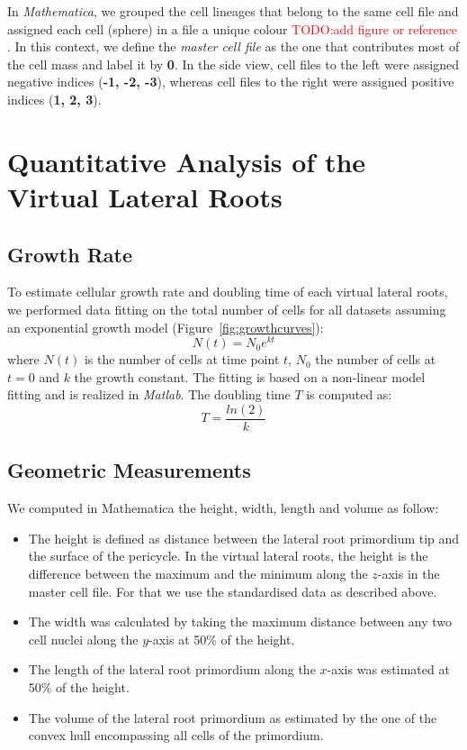 \documentclass[11pt,a4paper, final]{article}
\newcommand{\TODO}[1]{
\textcolor{red}{TODO:#1}
}
\newenvironment{Itemize}{
  \begin{itemize}[leftmargin=0.5cm]{
}}{\end{itemize}}
\begin{document}
In \textit{Mathematica}, we grouped the cell lineages that belong to the same cell file and assigned each cell (sphere) in a file a unique colour \TODO{add figure or reference}. In this context, we define the \textit{master cell file} as the one that contributes most of the cell mass and label it by \textbf{0}. In the side view, cell files to the left were assigned negative indices (\textbf{-1, -2, -3}), whereas cell files to the right were assigned positive indices (\textbf{1, 2, 3}).

\clearpage
\section{Quantitative Analysis of the Virtual Lateral Roots}
\subsection{Growth Rate}
To estimate cellular growth rate and doubling time of each virtual lateral roots, we performed data fitting on the total number of cells for all datasets assuming an exponential growth model (Figure~\ref{fig:growthcurves}):
\begin{equation}
N(t)=N_0e^{kt}
\end{equation} 
where $N(t)$ is the number of cells at time point $t$, $N_0$ the number of cells at $t=0$ and $k$ the growth constant. The fitting is based on a non-linear model fitting and is realized in \textit{Matlab}.
The doubling time $T$ is computed as:
\begin{equation}
T=\frac{ln(2)}{k}
\end{equation}

\subsection{Geometric Measurements}
We computed in Mathematica the height, width, length and volume as follow:
\begin{Itemize}
 \item The height is defined as distance between the lateral root primordium tip and the surface of the pericycle. In the virtual lateral roots, the height is the difference between the maximum and the minimum along the $z$-axis in the master cell file. For that we use the standardised data as described above.
 \item The width was calculated by taking the maximum distance between any two cell nuclei along the $y$-axis at 50\% of the height.
 \item The length of the lateral root primordium along the $x$-axis was estimated at 50\% of the height. 
 \item The volume of the lateral root primordium as estimated by the one of the convex hull encompassing all cells of the primordium.
\end{Itemize} 
\end{document}
